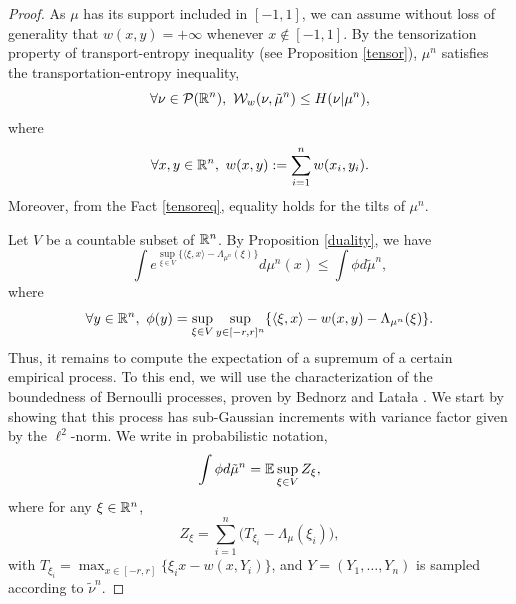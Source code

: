 \documentclass[a4paper,oneside,11pt]{article}
\begin{document}
\begin{proof} As $\mu$ has its support included in $[-1,1]$, we can assume without loss of generality that $w(x,y) = +\infty$ whenever $x \notin [-1,1]$. By the tensorization property of transport-entropy inequality (see Proposition \ref{tensor}), $\mu^n$ satisfies the transportation-entropy inequality,
$$ \forall \nu \in \mathcal{P}(\RR^n), \ \mathcal{W}_w(\nu,\tilde \mu^n) \leq H(\nu|\mu^n),$$
where
$$ \forall x,y \in \mathbb{R}^n, \ w(x,y ) := \sum_{i=1}^n w(x_i,y_i).$$
 Moreover, from the Fact \ref{tensoreq}, equality holds for the tilts of $\mu^n$. 


Let $V$ be a countable subset of $\mathbb{R}^n$.  By Proposition \ref{duality}, we have
$$ \int e^{\sup_{\xi \in V}\{ \langle \xi, x\rangle - \Lambda_{\mu^n}(\xi) \}} d\mu^n(x) \leq \int \phi d\tilde \mu^n,$$
where 
$$ \forall y \in \mathbb{R}^n, \ \phi(y) = \sup_{\xi \in V}\sup_{ y\in [-r,r]^n}  \{ \langle \xi, x\rangle -w(x,y) -\Lambda_{\mu^n}(\xi)\}.$$
Thus, it remains to compute the expectation of a supremum of a certain empirical process. To this end, we will use the characterization of the boundedness of Bernoulli processes, proven by Bednorz and Lata\l{}a \cite{BL}. We start by showing that this process has sub-Gaussian increments with variance factor given by the $\ell^2$-norm. We write in probabilistic notation, 
$$ \int \phi d\tilde \mu^n = \mathbb{E} \sup_{\xi\in V} Z_{\xi},$$
where for any $\xi \in \mathbb{R}^n$,
$$ Z_{\xi} = \sum_{i=1}^n \big(T_{\xi_i}- \Lambda_\mu(\xi_i)\big),$$
with $T_{\xi_i} =  \max_{x \in [-r,r]} \{ \xi_i x -w(x,Y_i) \}$, and $Y=(Y_1,\ldots ,Y_n)$ is sampled according to $\tilde \nu^n$. 
%


\end{proof}
\end{document}
